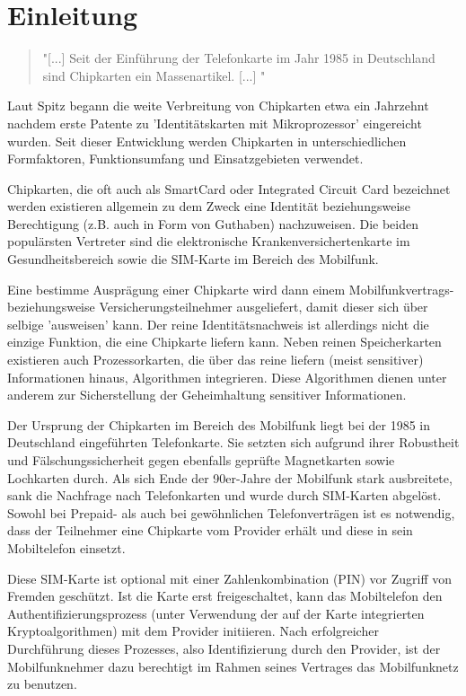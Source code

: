 \section{Einleitung}
\label{einleitung}
\begin{quote}
"[...] Seit der Einführung der Telefonkarte im Jahr 1985 in Deutschland sind Chipkarten ein
Massenartikel. [...] "\cite{spitz11}
\end{quote}

Laut Spitz begann die weite Verbreitung von Chipkarten etwa ein Jahrzehnt nachdem erste Patente
zu 'Identitätskarten mit Mikroprozessor' eingereicht wurden. Seit dieser Entwicklung
werden Chipkarten in unterschiedlichen Formfaktoren, Funktionsumfang und Einsatzgebieten
verwendet.

Chipkarten, die oft auch als SmartCard oder Integrated Circuit Card bezeichnet werden existieren
allgemein zu dem Zweck eine Identität beziehungsweise Berechtigung (z.B. auch in Form von Guthaben) nachzuweisen.
Die beiden populärsten Vertreter sind die elektronische Krankenversichertenkarte im Gesundheitsbereich
sowie die \ac{SIM}-Karte im Bereich des Mobilfunk.

Eine bestimme Ausprägung einer Chipkarte wird dann einem Mobilfunkvertrags- beziehungsweise Versicherungsteilnehmer
ausgeliefert, damit dieser sich über selbige 'ausweisen' kann. Der reine Identitätsnachweis ist
allerdings nicht die einzige Funktion, die eine Chipkarte liefern kann. Neben reinen Speicherkarten
existieren auch Prozessorkarten, die über das reine liefern (meist sensitiver) Informationen hinaus,
Algorithmen integrieren. Diese Algorithmen dienen unter anderem zur Sicherstellung der Geheimhaltung
sensitiver Informationen.

Der Ursprung der Chipkarten im Bereich des Mobilfunk liegt bei der 1985 in Deutschland eingeführten
Telefonkarte. Sie setzten sich aufgrund ihrer Robustheit und Fälschungssicherheit gegen ebenfalls
geprüfte Magnetkarten sowie Lochkarten durch. Als sich Ende der 90er-Jahre der Mobilfunk stark
ausbreitete, sank die Nachfrage nach Telefonkarten und wurde durch \ac{SIM}-Karten abgelöst.
Sowohl bei Prepaid- als auch bei gewöhnlichen Telefonverträgen ist es notwendig, dass der Teilnehmer
eine Chipkarte vom Provider erhält und diese in sein Mobiltelefon einsetzt.

Diese \ac{SIM}-Karte ist optional mit einer Zahlenkombination (\ac{PIN}) vor Zugriff von Fremden geschützt.
Ist die Karte erst freigeschaltet, kann das Mobiltelefon den Authentifizierungsprozess (unter Verwendung der
auf der Karte integrierten Kryptoalgorithmen) mit dem Provider initiieren. Nach erfolgreicher Durchführung
dieses Prozesses, also Identifizierung durch den Provider, ist der Mobilfunknehmer dazu berechtigt
im Rahmen seines Vertrages das Mobilfunknetz zu benutzen.

